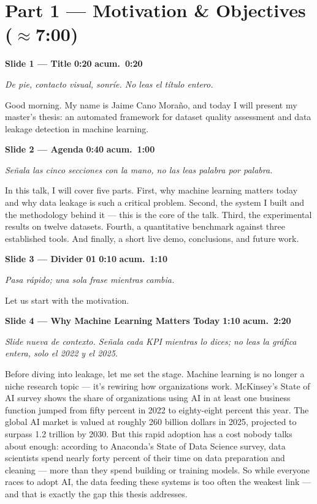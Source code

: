 \documentclass[11pt,a4paper]{article}
\newcommand{\slide}[6]{%
\begin{mdframed}[backgroundcolor=paleBlue, linecolor=upmBlue, linewidth=1pt,
                 roundcorner=4pt, skipabove=10pt, skipbelow=2pt,
                 innertopmargin=6pt, innerbottommargin=6pt]
\textbf{\color{upmBlue}Slide #1 --- #2}\hfill
\colorbox{upmOrange}{\color{white}\small\textbf{ #3 }}\;%
\colorbox{upmBlue}{\color{white}\small\textbf{ acum.\ #4 }}
\end{mdframed}
{\small\itshape\color{grayTxt}#5}\par\vspace{2pt}
#6\par\vspace{6pt}}
\begin{document}
\section*{\color{upmBlue}Part 1 --- Motivation \& Objectives (\normalfont$\approx$7:00)}

\slide{1}{Title}{0:20}{0:20}
{De pie, contacto visual, sonríe. No leas el título entero.}
{Good morning. My name is Jaime Cano Moraño, and today I will present my
master's thesis: an automated framework for dataset quality assessment and
data leakage detection in machine learning.}

\slide{2}{Agenda}{0:40}{1:00}
{Señala las cinco secciones con la mano, no las leas palabra por palabra.}
{In this talk, I will cover five parts. First, why machine learning matters
today and why data leakage is such a critical problem. Second, the system
I built and the methodology behind it --- this is the core of the talk.
Third, the experimental results on twelve datasets. Fourth, a quantitative
benchmark against three established tools. And finally, a short live demo,
conclusions, and future work.}

\slide{3}{Divider 01}{0:10}{1:10}
{Pasa rápido; una sola frase mientras cambia.}
{Let us start with the motivation.}

\slide{4}{Why Machine Learning Matters Today}{1:10}{2:20}
{Slide nueva de contexto. Señala cada KPI mientras lo dices; no leas la
gráfica entera, solo el 2022 y el 2025.}
{Before diving into leakage, let me set the stage. Machine learning is no
longer a niche research topic --- it's rewiring how organizations work.
McKinsey's State of AI survey shows the share of organizations using AI in
at least one business function jumped from fifty percent in 2022 to
eighty-eight percent this year. The global AI market is valued at roughly
260 billion dollars in 2025, projected to surpass 1.2 trillion by 2030. But
this rapid adoption has a cost nobody talks about enough: according to
Anaconda's State of Data Science survey, data scientists spend nearly forty
percent of their time on data preparation and cleaning --- more than they
spend building or training models. So while everyone races to adopt AI, the
data feeding these systems is too often the weakest link --- and that is
exactly the gap this thesis addresses.}
\end{document}

